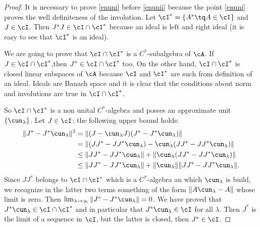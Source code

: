 \begin{proof}
It is necessary to prove \ref{enuni} before \ref{enunii} because the point \ref{enuni} proves the well definiteness of the involution. Let $\cI^*=\{ A^*\tq A\in\cI \}$ and $J\in\cI$. Then $J^*J\in\cI\cap\cI^*$ because an ideal is left and right ideal (it is easy to see that $\cI^*$ is an ideal).

We are going to prove that $\cI\cap\cI^*$ is a $C^*$-subalgebra of $\cA$. If $J\in \cI\cap\cI^*$,then $J^*\in \cI\cap\cI^*$ too. On the other hand, $\cI\cap\cI^*$ is closed linear subspaces of $\cA$ because $\cI$ and $\cI^*$ are such from definition of an ideal. Ideals are Banach space and it is clear that the conditions about norm and involutions are true in $\cI\cap\cI^*$.

So $\cI\cap\cI^*$ is a non unital $C^*$-algebra and posses an approximate unit $\{ \cun_{\lambda} \}$. Let $J\in\cI$; the following upper bound holds:
\begin{equation}
\begin{split}
\| J^*-J^*\cun_{\lambda} \|^2&=\| (J-\cun_{\lambda}J)(J^*-J^*\cun_{\lambda}) \|\\
                            &=\| (JJ^*-JJ^*\cun_{\lambda})-\cun_{\lambda}(JJ^*-JJ^*\cun_{\lambda}) \|\\
                            &\leq \| JJ^*-JJ^*\cun_{\lambda} \|+\| \cun_{\lambda}(JJ^*-JJ^*\cun_{\lambda}) \|\\
                            &\leq \| JJ^*-JJ^*\cun_{\lambda} \|+\| \cun_{\lambda} \|\| JJ^*-JJ^*\cun_{\lambda} \|.
\end{split}
\end{equation}
Since $JJ^*$ belongs to $\cI\cap\cI^*$ which is a $C^*$-algebra an which $\cun_{\lambda}$ is build, we recognize in the latter two terms something of the form $\| A\cun_{\lambda}-A \|$ whose limit is zero. Then $\lim_{\lambda\to\infty}\| J^*-J^*\cun_{\lambda} \|=0$.
 We have proved that $J^*\cun_{\lambda}\in\cI\cap\cI^*$ and in particular that $J^*\cun_{\lambda}\in\cI$ for all $\lambda$. Then $J^*$ is the limit of a sequence in $\cI$, but the latter is closed, then $J^*\in\cI$.


\end{proof}
